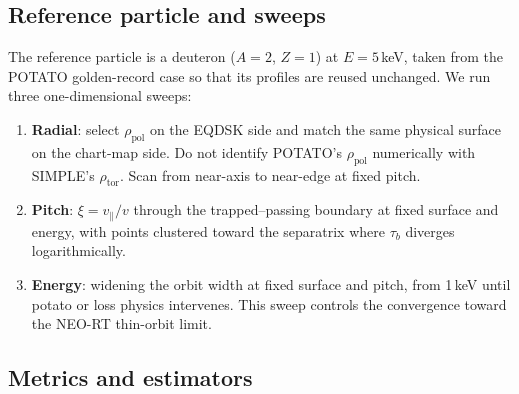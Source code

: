 \documentclass[11pt,a4paper]{article}
\begin{document}
\subsection{Reference particle and sweeps}

The reference particle is a deuteron ($A=2$, $Z=1$) at $E = 5\,$keV, taken
from the POTATO golden-record case so that its profiles are reused unchanged.
We run three one-dimensional sweeps:
\begin{enumerate}
\item \textbf{Radial}: select $\rho_{\mathrm{pol}}$ on the EQDSK side and
  match the same physical surface on the chart-map side. Do not identify
  POTATO's $\rho_{\mathrm{pol}}$ numerically with SIMPLE's
  $\rho_{\mathrm{tor}}$. Scan from near-axis to near-edge at fixed pitch.
\item \textbf{Pitch}: $\xi=v_\parallel/v$ through the trapped--passing
  boundary at fixed surface and energy, with points clustered toward the
  separatrix where $\tau_b$ diverges logarithmically.
\item \textbf{Energy}: widening the orbit width at fixed surface and pitch,
  from 1\,keV until potato or loss physics intervenes. This sweep controls the
  convergence toward the NEO-RT thin-orbit limit.
\end{enumerate}

\subsection{Metrics and estimators}
\label{sec:metrics}
\end{document}
